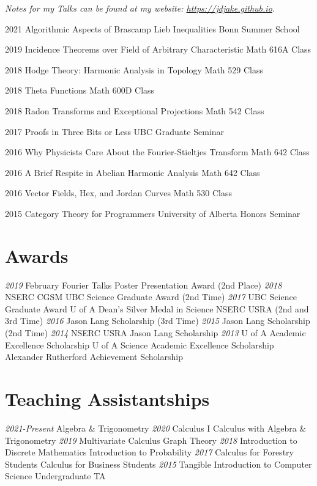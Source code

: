\documentclass[a4paper]{cv-friggeri}
\begin{document}
\emph{Notes for my Talks can be found at my website: \href{https://jdjake.github.io}{https://jdjake.github.io}.}

\begin{entrylist}

\entry
{2021}
{Algorithmic Aspects of Brascamp Lieb Inequalities}
{Bonn Summer School}

\entry
{2019}
{Incidence Theorems over Field of Arbitrary Characteristic}
{Math 616A Class}
{}

\entry
{2018}
{Hodge Theory: Harmonic Analysis in Topology}
{Math 529 Class}
{}

\entry
{2018}
{Theta Functions}
{Math 600D Class}
{}

\entry
{2018}
{Radon Transforms and Exceptional Projections}
{Math 542 Class}
{}

\entry
{2017}
{Proofs in Three Bits or Less}
{UBC Graduate Seminar}
{}

\entry
{2016}
{Why Physicists Care About the Fourier-Stieltjes Transform}
{Math 642 Class}
{}

\entry
{2016}
{A Brief Respite in Abelian Harmonic Analysis}
{Math 642 Class}
{}

\entry
{2016}
{Vector Fields, Hex, and Jordan Curves}
{Math 530 Class}
{}

\entry
{2015}
{Category Theory for Programmers}
{University of Alberta Honors Seminar}
{}

\end{entrylist}

\begin{asidenotit}
\section{Awards}
\emph{2019}
February Fourier Talks Poster Presentation Award (2nd Place)
\emph{2018}
NSERC CGSM
UBC Science Graduate Award
(2nd Time)
\emph{2017}
UBC Science
Graduate Award
U of A Dean's Silver Medal in Science
NSERC USRA
(2nd and 3rd Time)
\emph{2016}
Jason Lang Scholarship
(3rd Time)
\emph{2015}
Jason Lang Scholarship
(2nd Time)
\emph{2014}
NSERC USRA
Jason Lang Scholarship
\emph{2013}
U of A Academic Excellence Scholarship
U of A Science Academic Excellence Scholarship
Alexander Rutherford Achievement Scholarship
~
\section{Teaching Assistantships}
\emph{2021-Present}
Algebra \& Trigonometry
\emph{2020}
Calculus I
Calculus with Algebra \& Trigonometry
\emph{2019}
Multivariate Calculus
Graph Theory
\emph{2018}
Introduction to Discrete Mathematics
Introduction to Probability
\emph{2017}
Calculus for Forestry Students
Calculus for Business Students
\emph{2015}
Tangible Introduction to Computer Science Undergraduate TA
\end{asidenotit}
\end{document}
